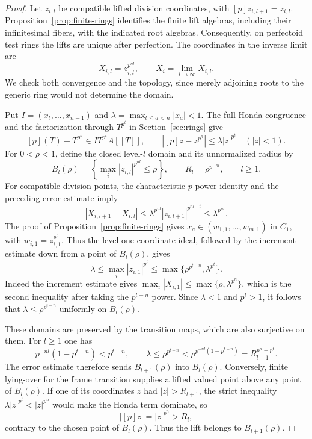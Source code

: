 \begin{proof}
Let $z_{i,l}$ be compatible lifted division coordinates, with
$[p]z_{i,l+1}=z_{i,l}$.  Proposition~\ref{prop:finite-rings} identifies
the finite lift algebras, including their infinitesimal fibers, with
the indicated root algebras.  Consequently, on perfectoid test rings
the lifts are unique after perfection.  The coordinates in the inverse
limit are
\[
 X_{i,l}=z_{i,l}^{p^{nl}},\qquad
 X_i=\lim_{l\to\infty}X_{i,l}.
\]
We check both convergence and the topology, since merely adjoining
roots to the generic ring would not determine the domain.

Put $I=(x_t,\ldots,x_{n-1})$ and
$\lambda=\max_{t\leq a<n}|x_a|<1$.  The full Honda congruence and the
factorization through $T^{p^t}$ in Section~\ref{sec:rings} give
\[
 [p](T)-T^{p^n}\in I T^{p^t}A[[T]],\qquad
 |[p]z-z^{p^n}|\leq\lambda |z|^{p^t}\quad (|z|<1).
\]
For $0<\rho<1$, define the closed level-$l$ domain and its unnormalized
radius by
\[
 B_l(\rho)=\left\{\max_i|z_{i,l}|^{p^{nl}}\leq\rho\right\},
 \qquad R_l=\rho^{p^{-nl}},\qquad l\geq1.
\]
For compatible division points, the characteristic-$p$ power identity
and the preceding error estimate imply
\[
 |X_{i,l+1}-X_{i,l}|
 \leq\lambda^{p^{nl}}|z_{i,l+1}|^{p^{nl+t}}
 \leq\lambda^{p^{nl}}.
\]
The proof of Proposition~\ref{prop:finite-rings} gives
$x_a\in(w_{1,1},\ldots,w_{m,1})$ in $C_1$, with
$w_{i,1}=z_{i,1}^{p^t}$.  Thus the level-one coordinate ideal, followed
by the increment estimate down from a point of $B_l(\rho)$, gives
\[
 \lambda\leq\max_i|z_{i,1}|^{p^t}
 \leq\max\{\rho^{p^{t-n}},\lambda^{p^t}\}.
\]
Indeed the increment estimate gives
$\max_i|X_{i,1}|\leq\max\{\rho,\lambda^{p^n}\}$, which is the second
inequality after taking the $p^{t-n}$ power.  Since $\lambda<1$ and
$p^t>1$, it follows that $\lambda\leq\rho^{p^{t-n}}$ uniformly on
$B_l(\rho)$.

These domains are preserved by the transition maps, which are also
surjective on them.  For $l\geq1$ one has
\[
 p^{-nl}(1-p^{t-n})<p^{t-n},\qquad
 \lambda\leq\rho^{p^{t-n}}
 <\rho^{p^{-nl}(1-p^{t-n})}=R_{l+1}^{p^n-p^t}.
\]
The error estimate therefore sends $B_{l+1}(\rho)$ into $B_l(\rho)$.
Conversely, finite lying-over for the frame transition supplies a
lifted valued point above any point of $B_l(\rho)$.  If one of its
coordinates $z$ had $|z|>R_{l+1}$, the strict inequality
$\lambda |z|^{p^t}<|z|^{p^n}$ would make the Honda term dominate, so
\[
 |[p]z|=|z|^{p^n}>R_l,
\]
contrary to the chosen point of $B_l(\rho)$.  Thus the lift belongs to
$B_{l+1}(\rho)$.


\end{proof}
